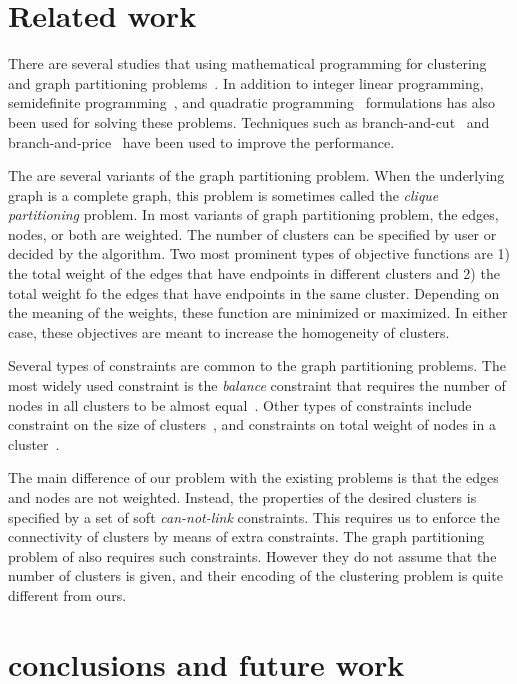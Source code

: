 \documentclass[conference]{IEEEtran}
\begin{document}
\section{Related work}
\label{sec:related}
There are several studies that using mathematical programming
for clustering and graph partitioning
problems~\cite{HansenJ97}. In addition to integer linear programming, semidefinite programming~\cite{ArmbrusterFHM08,LisserR03}, and quadratic programming~\cite{FanP10} formulations has also been used for solving these problems. Techniques such as branch-and-cut~\cite{FerreiraMSWW98,GrotschelW89} and branch-and-price~\cite{MehrotraT98,JiM07} have been used to improve the performance. 

The are several variants of the graph partitioning problem. When the underlying graph is a complete graph, this problem is sometimes called the \emph{clique partitioning} problem. In most variants of graph partitioning problem, the edges, nodes, or both are weighted. The number of clusters can be specified by user or decided by the algorithm. Two most prominent types of objective functions are 1) the total weight of the edges that have endpoints in different clusters and 2) the total weight fo the edges that have endpoints in the same cluster. Depending on the meaning of the weights, these function are minimized or maximized. In either case, these objectives are meant to increase the homogeneity of clusters.  

Several types of constraints are common to the graph partitioning problems. The most widely used constraint is the \emph{balance} constraint that requires the number of nodes in all clusters to be almost equal~\cite{LabbeO10}. Other types of constraints include constraint on the size of clusters~\cite{FanP10}, and constraints on total weight of nodes in a cluster~\cite{FerreiraMSWW98}. 

The main difference of our problem with the existing problems is that the edges and nodes are not weighted. Instead, the properties of the desired clusters is specified by a set of soft \emph{can-not-link} constraints. This requires us to enforce the connectivity of clusters by means of extra constraints. The graph partitioning problem of \cite{Benati2017} also requires such constraints. However they do not assume that the number of clusters is given, and their encoding of the clustering problem is quite different from ours. 


\section{conclusions and future work}
\label{sec:conclusion}



\end{document}
